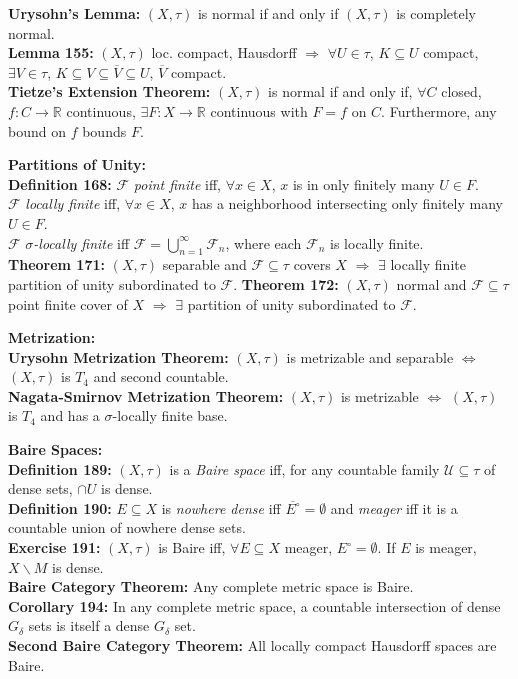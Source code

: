\documentclass[11pt]{article}
\newcommand{\sminus}{\backslash}
\newcommand{\R}{\mathbb{R}} %
\begin{document}
{\bf Urysohn's Lemma:} $(X,\tau)$ is normal if and only if $(X,\tau)$ is
completely normal. \\
{\bf Lemma 155:} $(X,\tau)$ loc. compact, Hausdorff $\Rightarrow$
$\forall U \in \tau$, $K \subseteq U$ compact, $\exists V \in \tau$,
$K \subseteq V \subseteq \overline{V} \subseteq U$, $\overline{V}$ compact. \\
{\bf Tietze's Extension Theorem:}  $(X,\tau)$ is normal if and only if,
$\forall C$ closed, $f : C \rightarrow \R$ continuous, $\exists F : X
\rightarrow \R$ continuous with $F = f$ on $C$. Furthermore, any bound on $f$
bounds $F$.

{\bf Partitions of Unity:} \\
{\bf Definition 168:}
$\mathcal{F}$ \emph{point finite} iff, $\forall x \in X$, $x$ is in only
finitely many $U \in F$. \\
$\mathcal{F}$ \emph{locally finite} iff, $\forall x \in X$, $x$ has a
neighborhood intersecting only finitely many $U \in F$. \\
$\mathcal{F}$ \emph{$\sigma$-locally finite} iff $\mathcal{F} =
\bigcup_{n = 1}^{\infty} \mathcal{F}_n$, where each $\mathcal{F}_n$ is locally
finite. \\
{\bf Theorem 171:} $(X,\tau)$ separable and $\mathcal{F} \subseteq \tau$ covers
$X$ $\Rightarrow$ $\exists$ locally finite partition of unity subordinated to
$\mathcal{F}$.
{\bf Theorem 172:} $(X,\tau)$ normal and $\mathcal{F} \subseteq \tau$ point
finite cover of $X$ $\Rightarrow$ $\exists$ partition of unity subordinated to
$\mathcal{F}$.

{\bf Metrization:} \\
{\bf Urysohn Metrization Theorem:} $(X,\tau)$ is metrizable and separable
$\Leftrightarrow$ $(X,\tau)$ is $T_4$ and second countable. \\
{\bf Nagata-Smirnov Metrization Theorem:} $(X,\tau)$ is metrizable
$\Leftrightarrow$ $(X,\tau)$ is $T_4$ and has a $\sigma$-locally finite base.

{\bf Baire Spaces:} \\
{\bf Definition 189:} $(X,\tau)$ is a \emph{Baire space} iff, for any countable
family $\mathcal{U} \subseteq \tau$ of dense sets, $\cap U$ is dense. \\
{\bf Definition 190:} $E \subseteq X$ is \emph{nowhere dense} iff
$\overline{E^\circ} = \emptyset$ and \emph{meager} iff it is a countable union
of nowhere dense sets. \\
{\bf Exercise 191:} $(X,\tau)$ is Baire iff, $\forall E \subseteq X$ meager,
$E^\circ = \emptyset$. If $E$ is meager, $X \sminus M$ is dense. \\
{\bf Baire Category Theorem:} Any complete metric space is Baire. \\
{\bf Corollary 194:} In any complete metric space, a countable intersection of
dense $G_{\delta}$ sets is itself a dense $G_{\delta}$ set. \\
{\bf Second Baire Category Theorem:} All locally compact Hausdorff spaces are
Baire.
\end{document}

